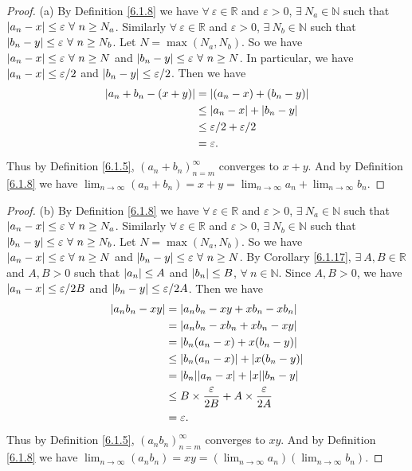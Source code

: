 \begin{proof}{(a)}
By Definition \ref{6.1.8} we have \(\forall\ \varepsilon \in \mathds{R}\) and \(\varepsilon > 0\), \(\exists\ N_a \in \mathds{N}\) such that \(\abs*{a_n - x} \leq \varepsilon \ \forall\ n \geq N_a\).
Similarly \(\forall\ \varepsilon \in \mathds{R}\) and \(\varepsilon > 0\), \(\exists\ N_b \in \mathds{N}\) such that \(\abs*{b_n - y} \leq \varepsilon \ \forall\ n \geq N_b\).
Let \(N = \max(N_a, N_b)\).
So we have \(\abs*{a_n - x} \leq \varepsilon \ \forall\ n \geq N\) and \(\abs*{b_n - y} \leq \varepsilon \ \forall\ n \geq N\).
In particular, we have \(\abs*{a_n - x} \leq \varepsilon / 2\) and \(\abs*{b_n - y} \leq \varepsilon / 2\).
Then we have
\begin{align*}
\abs*{a_n + b_n - (x + y)} &= \abs*{(a_n - x) + (b_n - y)} \\
&\leq \abs*{a_n - x} + \abs*{b_n - y} \\
&\leq \varepsilon / 2 + \varepsilon / 2 \\
&= \varepsilon.
\end{align*}
Thus by Definition \ref{6.1.5}, \((a_n + b_n)_{n = m}^\infty\) converges to \(x + y\).
And by Definition \ref{6.1.8} we have \(\lim_{n \to \infty} (a_n + b_n) = x + y = \lim_{n \to \infty} a_n + \lim_{n \to \infty} b_n\).
\end{proof}

\begin{proof}{(b)}
By Definition \ref{6.1.8} we have \(\forall\ \varepsilon \in \mathds{R}\) and \(\varepsilon > 0\), \(\exists\ N_a \in \mathds{N}\) such that \(\abs*{a_n - x} \leq \varepsilon \ \forall\ n \geq N_a\).
Similarly \(\forall\ \varepsilon \in \mathds{R}\) and \(\varepsilon > 0\), \(\exists\ N_b \in \mathds{N}\) such that \(\abs*{b_n - y} \leq \varepsilon \ \forall\ n \geq N_b\).
Let \(N = \max(N_a, N_b)\).
So we have \(\abs*{a_n - x} \leq \varepsilon \ \forall\ n \geq N\) and \(\abs*{b_n - y} \leq \varepsilon \ \forall\ n \geq N\).
By Corollary \ref{6.1.17}, \(\exists\ A, B \in \mathds{R}\) and \(A, B > 0\) such that \(\abs*{a_n} \leq A\) and \(\abs*{b_n} \leq B\), \(\forall\ n \in \mathds{N}\).
Since \(A, B > 0\), we have \(\abs*{a_n - x} \leq \varepsilon / 2B\) and \(\abs*{b_n - y} \leq \varepsilon / 2A\).
Then we have
\begin{align*}
\abs*{a_n b_n - x y} &= \abs*{a_n b_n - x y + x b_n - x b_n} \\
&= \abs*{a_n b_n - x b_n + x b_n - x y} \\
&= \abs*{b_n(a_n - x) + x(b_n - y)} \\
&\leq \abs*{b_n(a_n - x)} + \abs*{x(b_n - y)} \\
&= \abs*{b_n}\abs*{a_n - x} + \abs*{x}\abs*{b_n - y} \\
&\leq B \times \frac{\varepsilon}{2B} + A \times \frac{\varepsilon}{2A} \\
&= \varepsilon.
\end{align*}
Thus by Definition \ref{6.1.5}, \((a_n b_n)_{n = m}^\infty\) converges to \(x y\).
And by Definition \ref{6.1.8} we have \(\lim_{n \to \infty} (a_n b_n) = x y = (\lim_{n \to \infty} a_n)(\lim_{n \to \infty} b_n)\).
\end{proof}

